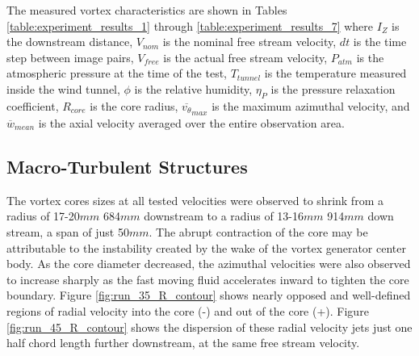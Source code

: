 

The measured vortex characteristics are shown in Tables
\ref{table:experiment_results_1} through \ref{table:experiment_results_7} where 
$I_Z$ is the downstream distance, 
$V_{nom}$ is the nominal free stream velocity, $dt$ is the time step between 
image pairs, $V_{free}$ is the actual free stream velocity, $P_{atm}$ is the 
atmospheric pressure at the time of the test, 
$T_{tunnel}$ is the temperature measured inside the wind tunnel, $\phi$ is the 
relative humidity, $\eta_P$ is the pressure relaxation coefficient, $R_{core}$ 
is the core radius, $\overline{v_{\theta}}_{max}$ 
is the maximum azimuthal velocity, and $\overline{w}_{mean}$ is the axial 
velocity averaged over the entire observation area.









\subsection{Macro-Turbulent Structures}
\label{section:macroturb}

The vortex cores sizes at all tested velocities were observed to shrink from 
a radius of 17-20$mm$ 684$mm$ downstream to a radius of 13-16$mm$ 914$mm$ down 
stream, a span of just 50$mm$. The abrupt contraction of the core 
may be attributable to the instability created by the wake of the vortex 
generator center body. As the core diameter decreased, the azimuthal velocities 
were also observed to increase sharply as the fast moving fluid accelerates 
inward to tighten the core boundary. Figure \ref{fig:run_35_R_contour} shows 
nearly opposed and well-defined regions of radial velocity into the core (-) 
and out of the core (+). Figure \ref{fig:run_45_R_contour} shows the dispersion 
of these radial velocity jets just one half chord length further downstream, at 
the same free stream velocity. 




